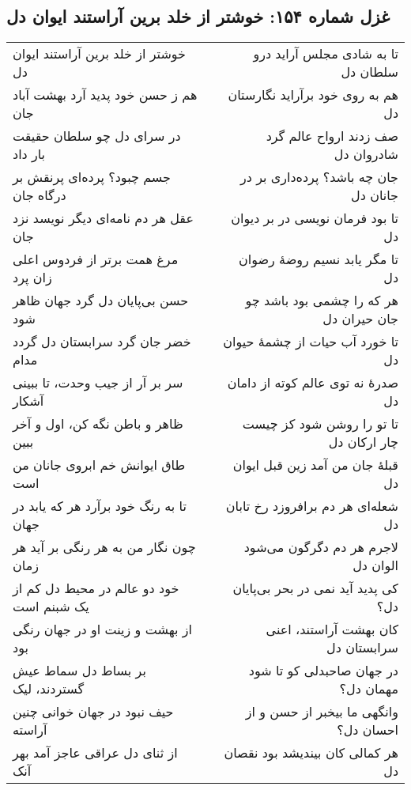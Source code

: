 \begin{center}
\section*{غزل شماره ۱۵۴: خوشتر از خلد برین آراستند ایوان دل}
\label{sec:154}
\begin{longtable}{l p{0.5cm} r}
خوشتر از خلد برین آراستند ایوان دل
&&
تا به شادی مجلس آراید درو سلطان دل
\\
هم ز حسن خود پدید آرد بهشت آباد جان
&&
هم به روی خود برآراید نگارستان دل
\\
در سرای دل چو سلطان حقیقت بار داد
&&
صف زدند ارواح عالم گرد شادروان دل
\\
جسم چبود؟ پرده‌ای پرنقش بر درگاه جان
&&
جان چه باشد؟ پرده‌داری بر در جانان دل
\\
عقل هر دم نامه‌ای دیگر نویسد نزد جان
&&
تا بود فرمان نویسی در بر دیوان دل
\\
مرغ همت برتر از فردوس اعلی زان پرد
&&
تا مگر یابد نسیم روضهٔ رضوان دل
\\
حسن بی‌پایان دل گرد جهان ظاهر شود
&&
هر که را چشمی بود باشد چو جان حیران دل
\\
خضر جان گرد سرابستان دل گردد مدام
&&
تا خورد آب حیات از چشمهٔ حیوان دل
\\
سر بر آر از جیب وحدت، تا ببینی آشکار
&&
صدرهٔ نه توی عالم کوته از دامان دل
\\
ظاهر و باطن نگه کن، اول و آخر ببین
&&
تا تو را روشن شود کز چیست چار ارکان دل
\\
طاق ایوانش خم ابروی جانان من است
&&
قبلهٔ جان من آمد زین قبل ایوان دل
\\
تا به رنگ خود برآرد هر که یابد در جهان
&&
شعله‌ای هر دم برافروزد رخ تابان دل
\\
چون نگار من به هر رنگی بر آید هر زمان
&&
لاجرم هر دم دگرگون می‌شود الوان دل
\\
خود دو عالم در محیط دل کم از یک شبنم است
&&
کی پدید آید نمی در بحر بی‌پایان دل؟
\\
از بهشت و زینت او در جهان رنگی بود
&&
کان بهشت آراستند، اعنی سرابستان دل
\\
بر بساط دل سماط عیش گستردند، لیک
&&
در جهان صاحبدلی کو تا شود مهمان دل؟
\\
حیف نبود در جهان خوانی چنین آراسته
&&
وانگهی ما بیخبر از حسن و از احسان دل؟
\\
از ثنای دل عراقی عاجز آمد بهر آنک
&&
هر کمالی کان بیندیشد بود نقصان دل
\\
\end{longtable}
\end{center}
